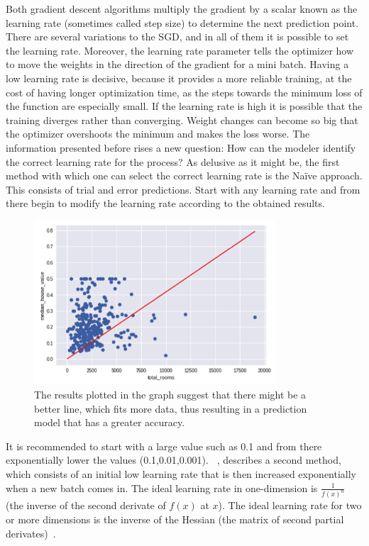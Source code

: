 Both gradient descent algorithms multiply the gradient by a scalar known as the learning rate 
(sometimes called step size) to determine the next prediction point. There are several variations to 
the \ac{SGD}, and in all of them it is possible to set the learning rate.  Moreover, the learning rate 
parameter tells the optimizer how to move the weights in the direction of the gradient for a mini batch. 
Having a low learning rate is decisive, because it provides a more reliable training, at the cost of 
having longer optimization time, as the steps towards the minimum loss of the function are especially 
small. If the learning rate is high it is possible that the training diverges rather than converging. 
Weight changes can become so big that the optimizer overshoots the minimum and makes the loss 
worse. The information presented before rises a new question: How can the modeler identify the 
correct learning rate for the process? 
As delusive as it might be, the first method with which one can select the correct learning rate is the 
Na\"ive approach. This consists of trial and error predictions. Start with any learning rate and from 
there begin to modify the learning rate according to the obtained results. 

\begin{figure}[htbp]
  \centering
  \includegraphics[width=0.8\textwidth]{images/linearGraph}
  \caption{ The results plotted in the graph suggest that there might be a better line, which fits more data, thus resulting in a prediction model that has a greater accuracy.}
  \label{fig:linearGraph}
\end{figure}


It is recommended to start with a large value such as 0.1 and from there exponentially lower the 
values (0.1,0.01,0.001).
~\citet{leslie15}, describes a second method, which consists of an initial low learning rate that is then 
increased exponentially when a new batch comes in.
The ideal learning rate in one-dimension is $\frac{1}{f(x)^n}$ (the inverse of the second derivate of 
$f(x)$ at $x$). The ideal learning rate for two or more dimensions is the inverse of the Hessian (the 
matrix of second partial derivates)~\cite{leslie15}.


